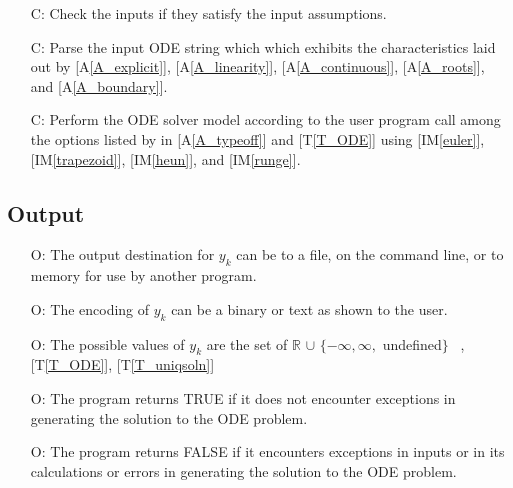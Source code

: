 \documentclass[12pt]{article}
\newcommand{\tref}[1]{T\ref{#1}}
\newcommand{\aref}[1]{A\ref{#1}}
\newcommand{\gsref}[1]{GS\ref{#1}}
\newcommand{\iref}[1]{IM\ref{#1}}
\newcounter{lcnum} %
\newcounter{calcnum} %
\newcounter{outputnum} %
\begin{document}
\begin{itemize}
\item[C\refstepcounter{calcnum}\thecalcnum \label{C_inputs}:]
Check the inputs if they satisfy the input assumptions.
~


\item[C\refstepcounter{calcnum}\thecalcnum \label{C_odeparse}:]
Parse the input ODE string which which exhibits the characteristics laid out by
[\aref{A_explicit}], [\aref{A_linearity}], [\aref{A_continuous}], [\aref{A_roots}], and
[\aref{A_boundary}].

\item[C\refstepcounter{calcnum}\thecalcnum \label{C_progname}:]
Perform the ODE solver model according to the user program call among the options listed by
in [\aref{A_typeoff}] and [\tref{T_ODE}] using [\iref{euler}], [\iref{trapezoid}],
[\iref{heun}], and [\iref{runge}].


\end{itemize}

\subsection{Output} \label{sec_Output}

\begin{itemize}
\item[O\refstepcounter{outputnum}\theoutputnum \label{O_outputyk}:]
The output destination for $y_k$ can be to a file, on the command line, or to memory for use by
another program.
~\newline
[\gsref{G_SolveForY}]

\item[O\refstepcounter{outputnum}\theoutputnum \label{O_encodingyk}:]
The encoding of $y_k$ can be a binary or text as shown to the user.

\item[O\refstepcounter{outputnum}\theoutputnum \label{O_valuesyk}:]
The possible values of $y_k$ are the set of $\mathbb{R}$
$\cup$ $\{-\infty, \infty,$ undefined$\}$
~\newline
[\gsref{G_SolveForY}], [\tref{T_ODE}], [\tref{T_uniqsoln}]

\item[O\refstepcounter{outputnum}\theoutputnum \label{O_success}:]
The program returns TRUE if it does not encounter exceptions in generating the solution
to the ODE problem.

\item[O\refstepcounter{outputnum}\theoutputnum \label{O_fail}:]
The program returns FALSE if it encounters exceptions in inputs or in its calculations
or errors in generating the solution to the ODE problem.
~\newline
[\gsref{G_SolveForY}]

\end{itemize}
\end{document}
